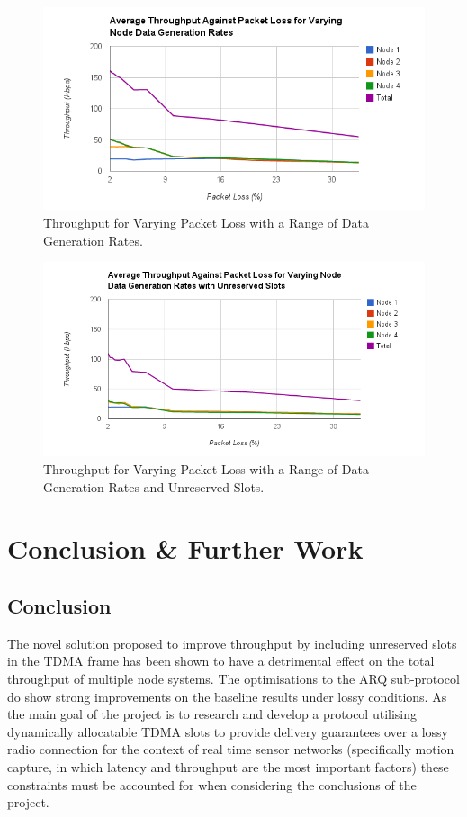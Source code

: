 \documentclass[parskip]{cs4rep}
\begin{document}
\begin{figure}
	\centering
	\includegraphics[width=120mm]{throughputvslossvaryinggeneration.png}
	\caption{Throughput for Varying Packet Loss with a Range of Data Generation Rates.}
	\label{fig:ThroughputVsLossGen}
\end{figure}

\begin{figure}
	\centering
	\includegraphics[width=120mm]{throughputvslossvaryinggenerationslots.png}
	\caption{Throughput for Varying Packet Loss with a Range of Data Generation Rates and Unreserved Slots.}
	\label{fig:ThroughputVsLossGenSlots}
\end{figure}

\chapter{Conclusion \& Further Work}

\section{Conclusion}

The novel solution proposed to improve throughput by including unreserved slots in the TDMA frame has been shown to have a detrimental effect on the total throughput of multiple node systems. The optimisations to the ARQ sub-protocol do show strong improvements on the baseline results under lossy conditions. As the main goal of the project is to research and develop a protocol utilising dynamically allocatable TDMA slots to provide delivery guarantees over a lossy radio connection for the context of real time sensor networks (specifically motion capture, in which latency and throughput are the most important factors) these constraints must be accounted for when considering the conclusions of the project. 
\end{document}
